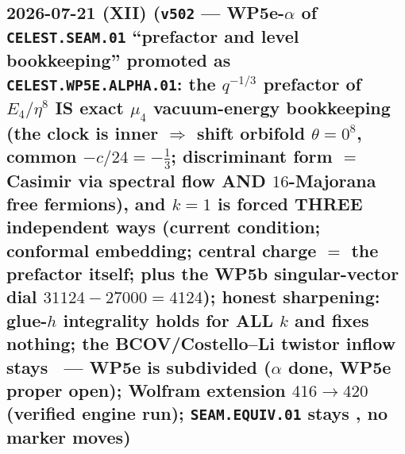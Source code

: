 \subsection*{2026-07-21 (XII) (\texttt{v502} --- WP5e-$\alpha$ of \texttt{CELEST.SEAM.01} ``prefactor and level bookkeeping'' promoted as \texttt{CELEST.WP5E.ALPHA.01}: the $q^{-1/3}$ prefactor of $E_4/\eta^8$ IS exact $\mu_4$ vacuum-energy bookkeeping (the clock is inner $\Rightarrow$ shift orbifold $\theta=0^8$, common $-c/24=-\tfrac13$; discriminant form $=$ Casimir via spectral flow AND $16$-Majorana free fermions), and $k=1$ is forced THREE independent ways (current condition; conformal embedding; central charge $=$ the prefactor itself; plus the WP5b singular-vector dial $31124-27000=4124$); honest sharpening: glue-$h$ integrality holds for ALL $k$ and fixes nothing; the BCOV/Costello--Li twistor inflow stays \mO\ --- WP5e is subdivided ($\alpha$ done, WP5e proper open); Wolfram extension $416\to420$ (verified engine run); \texttt{SEAM.EQUIV.01} stays \mO, no marker moves)}
